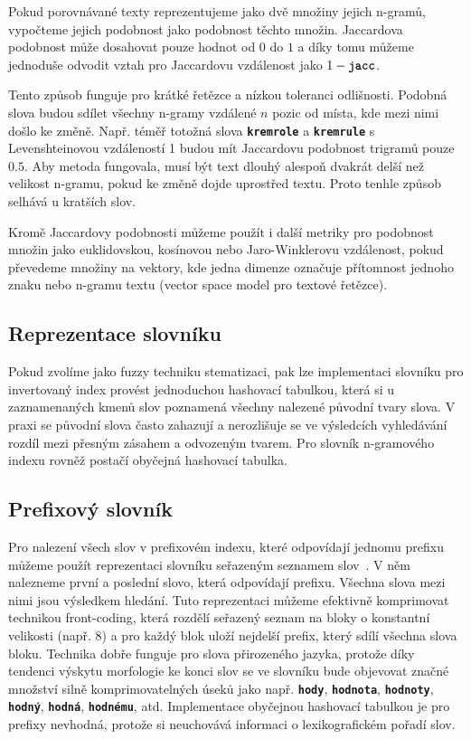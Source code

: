 \documentclass[11pt,letterpaper,oneside,openright]{book}
\newcommand{\bftt}[1]{\texttt{\textbf{#1}}}
\begin{document}
Pokud porovnávané texty reprezentujeme jako dvě množiny jejich n-gramů,
vypočteme jejich podobnost jako podobnost těchto množin. Jaccardova podobnost
může dosahovat pouze hodnot od $0$ do $1$ a díky tomu můžeme jednoduše odvodit
vztah pro Jaccardovu vzdálenost jako $1 - \bftt{jacc}$.

Tento způsob funguje pro krátké řetězce a nízkou toleranci odlišnosti. Podobná
slova budou sdílet všechny n-gramy vzdálené $n$ pozic od místa, kde mezi nimi
došlo ke změně. Např. téměř totožná slova \bftt{kremrole} a \bftt{kremrule} s
Levenshteinovou vzdáleností 1 budou mít Jaccardovu podobnost trigramů pouze
$0.5$. Aby metoda fungovala, musí být text dlouhý alespoň dvakrát delší než
velikost n-gramu, pokud ke změně dojde uprostřed textu. Proto tenhle způsob
selhává u kratších slov.

Kromě Jaccardovy podobnosti můžeme použít i další metriky pro podobnost množin
jako euklidovskou, kosínovou nebo Jaro-Winklerovu vzdálenost, pokud převedeme
množiny na vektory, kde jedna dimenze označuje přítomnost jednoho znaku nebo
n-gramu textu (vector space model pro textové řetězce).


\subsection{Reprezentace slovníku}
Pokud zvolíme jako fuzzy techniku stematizaci, pak lze implementaci slovníku
pro invertovaný index provést jednoduchou hashovací tabulkou, která si u
zaznamenaných kmenů slov poznamená všechny nalezené původní tvary slova. V
praxi se původní slova často zahazují a nerozlišuje se ve výsledcích
vyhledávání rozdíl mezi přesným zásahem a odvozeným tvarem. Pro slovník
n-gramového indexu rovněž postačí obyčejná hashovací tabulka.

\subsection{Prefixový slovník} \label{sec:prefix_dict}
Pro nalezení všech slov v prefixovém indexu, které odpovídají jednomu prefixu
můžeme použít reprezentaci slovníku seřazeným seznamem
slov~\citep[kap.~4]{buttcher2010information}. V něm nalezneme první a poslední
slovo, která odpovídají prefixu. Všechna slova mezi nimi jsou výsledkem
hledání. Tuto reprezentaci můžeme efektivně komprimovat technikou front-coding,
která rozdělí seřazený seznam na bloky o konstantní velikosti (např. 8) a pro
každý blok uloží nejdelší prefix, který sdílí všechna slova bloku. Technika
dobře funguje pro slova přirozeného jazyka, protože díky tendenci výskytu
morfologie ke konci slov se ve slovníku bude objevovat značné množství silně
komprimovatelných úseků jako např. \bftt{hody}, \bftt{hodnota}, \bftt{hodnoty},
\bftt{hodný}, \bftt{hodná}, \bftt{hodnému}, atd. Implementace obyčejnou
hashovací tabulkou je pro prefixy nevhodná, protože si neuchovává informaci o
lexikografickém pořadí slov.
\end{document}
